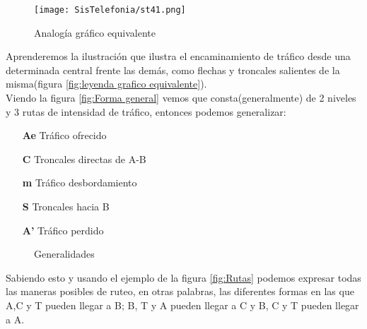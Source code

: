 \documentclass[
	12pt, %
	fleqn, %
	a4paper, %
]{LegrandOrangeBook}
\begin{document}
\begin{figure}[H]
\centering\texttt{[image: SisTelefonia/st41.png]}
\caption{Analogía gráfico equivalente}
\label{fig:analogia}
\end{figure}
Aprenderemos la ilustración que ilustra el encaminamiento de tráfico desde una determinada central frente las demás, como flechas y troncales salientes de la misma(figura \ref{fig:leyenda grafico equivalente}). \\
Viendo la figura \ref{fig:Forma general} vemos que consta(generalmente) de 2 niveles y 3 rutas de intensidad de tráfico, entonces podemos generalizar:
\begin{itemize}
\item[\textbf{Ae}] Tráfico ofrecido
\item[\textbf{C}] Troncales directas de A-B
\item[\textbf{m}]  Tráfico desbordamiento
\item[\textbf{S}] Troncales hacia B
\item[\textbf{A'}] Tráfico perdido
\end{itemize}
\begin{figure}[H]
\centering
{}
\caption{Generalidades}
\end{figure}
Sabiendo esto y usando el ejemplo de la figura \ref{fig:Rutas} podemos expresar todas las maneras posibles de ruteo, en otras palabras, las diferentes formas en las que A,C y T pueden llegar a B; B, T y A pueden llegar a C y B, C y T pueden llegar a A.
\end{document}
